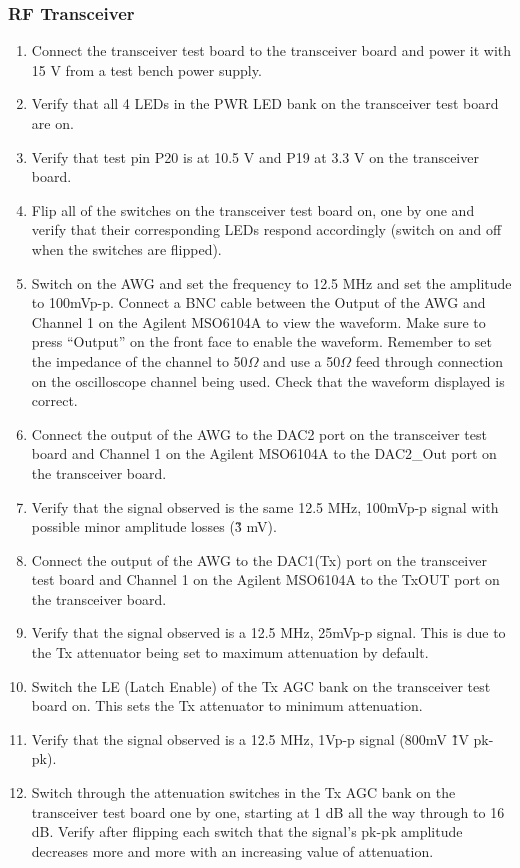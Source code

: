 \subsubsection{RF Transceiver}

\begin{enumerate}
	\item Connect the transceiver test board to the transceiver board and power it with 15 V from a test bench power supply.
	\item Verify that all 4 LEDs in the PWR LED bank on the transceiver test board are on.
	\item Verify that test pin P20 is at 10.5 V and P19 at 3.3 V on the transceiver board.
	\item Flip all of the switches on the transceiver test board on, one by one and verify that their corresponding LEDs respond accordingly (switch on and off when the switches are flipped).
	\item Switch on the AWG and set the frequency to 12.5 MHz and set the amplitude to 100mVp-p. Connect a BNC cable between the Output of the AWG and Channel 1 on the Agilent MSO6104A to view the waveform. Make sure to press “Output” on the front face to enable the waveform. Remember to set the impedance of the channel to 50$\Omega$ and use a 50$\Omega$ feed through connection on the oscilloscope channel being used. Check that the waveform displayed is correct.
	\item Connect the output of the AWG to the DAC2 port on the transceiver test board and Channel 1 on the Agilent MSO6104A to the DAC2\_Out port on the transceiver board.
	\item Verify that the signal observed is the same 12.5 MHz, 100mVp-p signal with possible minor amplitude losses (\~ 3 mV).
	\item Connect the output of the AWG to the DAC1(Tx) port on the transceiver test board and Channel 1 on the Agilent MSO6104A to the TxOUT port on the transceiver board.
	\item Verify that the signal observed is a 12.5 MHz, 25mVp-p signal. This is due to the Tx attenuator being set to maximum attenuation by default.
	\item Switch the LE (Latch Enable) of the Tx AGC bank on the transceiver test board on. This sets the Tx attenuator to minimum attenuation.
	\item Verify that the signal observed is a 12.5 MHz, 1Vp-p signal (800mV \~ 1V pk-pk).
	\item Switch through the attenuation switches in the Tx AGC bank on the transceiver test board one by one, starting at 1 dB all the way through to 16 dB. Verify after flipping each switch that the signal’s pk-pk amplitude decreases more and more with an increasing value of attenuation.

\end{enumerate}
